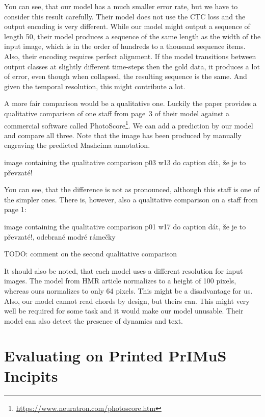 You can see, that our model has a much smaller error rate, but we have to consider this result carefully. Their model does not use the CTC loss and the output encoding is very different. While our model might output a sequence of length 50, their model produces a sequence of the same length as the width of the input image, which is in the order of hundreds to a thousand sequence items. Also, their encoding requires perfect alignment. If the model transitions between output classes at slightly different time-steps then the gold data, it produces a lot of error, even though when collapsed, the resulting sequence is the same. And given the temporal resolution, this might contribute a lot.

A more fair comparison would be a qualitative one. Luckily the paper provides a qualitative comparison of one staff from page~3 of their model against a commercial software called PhotoScore\footnote{\href{https://www.neuratron.com/photoscore.htm}{https://www.neuratron.com/photoscore.htm}}. We can add a prediction by our model and compare all three. Note that the image has been produced by manually engraving the predicted Mashcima annotation.

\begin{code}
image containing the qualitative comparison p03 w13
do caption dát, že je to převzaté!
\end{code}

You can see, that the difference is not as pronounced, although this staff is one of the simpler ones. There is, however, also a qualitative comparison on a staff from page 1:

\begin{code}
image containing the qualitative comparison p01 w17
do caption dát, že je to převzaté!, odebrané modré rámečky
\end{code}

TODO: comment on the second qualitative comparison

It should also be noted, that each model uses a different resolution for input images. The model from HMR article normalizes to a height of 100 pixels, whereas ours normalizes to only 64 pixels. This might be a disadvantage for us. Also, our model cannot read chords by design, but theirs can. This might very well be required for some task and it would make our model unusable. Their model can also detect the presence of dynamics and text.


\section{Evaluating on Printed PrIMuS Incipits}

